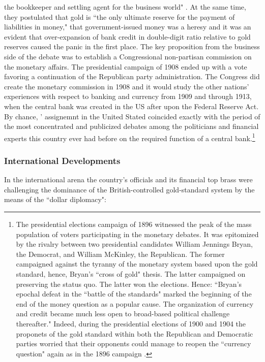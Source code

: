 {the bookkeeper and settling agent for the business world" \citep[p.~370]{roberts1909}.} At the same time, they postulated that gold is ``the only ultimate reserve for the payment of liabilities in money," that government-issued money was a heresy and it was an evident that over-expansion of bank credit in double-digit ratio relative to gold reserves caused the panic in the first place. The key proposition from the business side of the debate was to establish a Congressional non-partisan commission on the monetary affairs. The presidential campaign of 1908 ended up with a vote favoring a continuation of the Republican party administration. The Congress did create the monetary commission in 1908 and it would study the other nations' experiences with respect to banking and currency from 1909 and through 1913, when the central bank was created in the US after upon the Federal Reserve Act. By chance, \citeauthor{innes1913}' assignemnt in the United Stated coincided exactly with the period of the most concentrated and publicized debates among the politicians and financial experts this country ever had before on the required function of a central bank.\footnote{The presidential elections campaign of 1896 witnessed the peak of the mass population of voters participating in the monetary debates. It was epitomized by the rivalry between two presidential candidates William Jennings Bryan, the Democrat, and William McKinley, the Republican. The former campaigned against the tyranny of the monetary system based upon the gold standard, hence, Bryan's ``cross of gold" thesis. The latter campaigned on preserving the status quo. The latter won the elections. Hence: ``Bryan's epochal defeat in the ``battle of the standards" marked the beginning of the end of the money question as a popular cause. The organization of currency and credit became much less open to broad-based political challenge thereafter." \citep[p.~205]{sklansky2017} Indeed, during the presidential elections of 1900 and 1904 the proponets of the gold standard within both the Republican and Democratic parties worried that their opponents could manage to reopen the ``currency question" again as in the 1896 campaign \citep{mckinley1900}.}

\subsubsection*{International Developments}  

In the international arena the country's officials and its financial top brass were challenging the dominance of the British-controlled gold-standard system by the means of the ``dollar diplomacy": 

